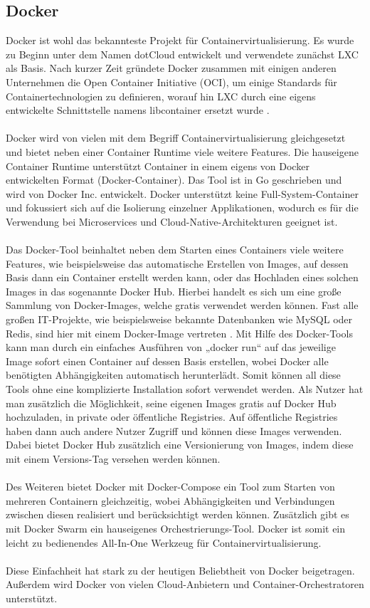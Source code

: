 \subsection{Docker}
Docker ist wohl das bekannteste Projekt für Containervirtualisierung. Es wurde zu Beginn unter dem Namen dotCloud entwickelt und verwendete zunächst LXC als Basis. Nach kurzer Zeit gründete Docker zusammen mit einigen anderen Unternehmen die Open Container Initiative (OCI), um einige Standards für Containertechnologien zu definieren, worauf hin LXC durch eine eigens entwickelte Schnittstelle namens libcontainer ersetzt wurde \cite{evan_baker_comprehensive_2021}.
\\\\
Docker wird von vielen mit dem Begriff Containervirtualisierung gleichgesetzt und bietet neben einer Container Runtime viele weitere Features. Die hauseigene Container Runtime unterstützt Container in einem eigens von Docker entwickelten Format (Docker-Container). Das Tool ist in Go geschrieben und wird von Docker Inc. entwickelt. Docker unterstützt keine Full-System-Container und fokussiert sich auf die Isolierung einzelner Applikationen, wodurch es für die Verwendung bei Microservices und Cloud-Native-Architekturen geeignet ist.
\\\\
Das Docker-Tool beinhaltet neben dem Starten eines Containers viele weitere Features, wie beispielsweise das automatische Erstellen von Images, auf dessen Basis dann ein Container erstellt werden kann, oder das Hochladen eines solchen Images in das sogenannte Docker Hub. Hierbei handelt es sich um eine große Sammlung von Docker-Images, welche gratis verwendet werden können. Fast alle großen IT-Projekte, wie beispielsweise bekannte Datenbanken wie MySQL oder Redis, sind hier mit einem Docker-Image vertreten \cite{noauthor_dockerhub_2021}. Mit Hilfe des Docker-Tools kann man durch ein einfaches Ausführen von „docker run“ auf das jeweilige Image sofort einen Container auf dessen Basis erstellen, wobei Docker alle benötigten Abhängigkeiten automatisch herunterlädt. Somit können all diese Tools ohne eine komplizierte Installation sofort verwendet werden. Als Nutzer hat man zusätzlich die Möglichkeit, seine eigenen Images gratis auf Docker Hub hochzuladen, in private oder öffentliche Registries. Auf öffentliche Registries haben dann auch andere Nutzer Zugriff und können diese Images verwenden. Dabei bietet Docker Hub zusätzlich eine Versionierung von Images, indem diese mit einem Versions-Tag versehen werden können.
\\\\
Des Weiteren bietet Docker mit Docker-Compose ein Tool zum Starten von mehreren Containern gleichzeitig, wobei Abhängigkeiten und Verbindungen zwischen diesen realisiert und berücksichtigt werden können. Zusätzlich gibt es mit Docker Swarm ein hauseigenes Orchestrierungs-Tool. Docker ist somit ein leicht zu bedienendes All-In-One Werkzeug für Containervirtualisierung.
\\\\
Diese Einfachheit hat stark zu der heutigen Beliebtheit von Docker beigetragen. Außerdem wird Docker von vielen Cloud-Anbietern und Container-Orchestratoren unterstützt.

